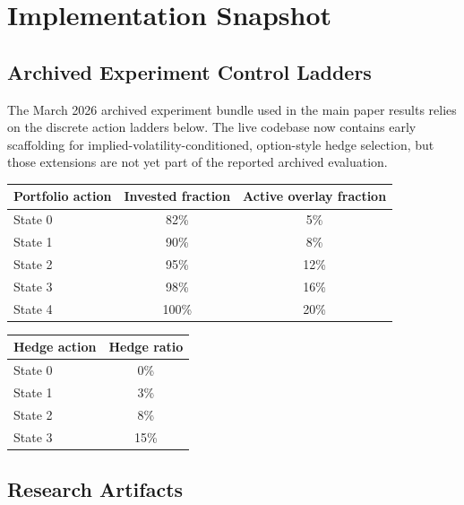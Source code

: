 \documentclass[11pt]{article}
\begin{document}
\appendix

\section{Implementation Snapshot}

\subsection{Archived Experiment Control Ladders}

The March 2026 archived experiment bundle used in the main paper results relies
on the discrete action ladders below. The live codebase now contains early
scaffolding for implied-volatility-conditioned, option-style hedge selection,
but those extensions are not yet part of the reported archived evaluation.

\begin{center}
\begin{tabular}{lcc}
\toprule
Portfolio action & Invested fraction & Active overlay fraction \\
\midrule
State 0 & 82\% & 5\% \\
State 1 & 90\% & 8\% \\
State 2 & 95\% & 12\% \\
State 3 & 98\% & 16\% \\
State 4 & 100\% & 20\% \\
\bottomrule
\end{tabular}
\end{center}

\begin{center}
\begin{tabular}{lc}
\toprule
Hedge action & Hedge ratio \\
\midrule
State 0 & 0\% \\
State 1 & 3\% \\
State 2 & 8\% \\
State 3 & 15\% \\
\bottomrule
\end{tabular}
\end{center}

\subsection{Research Artifacts}
\end{document}
